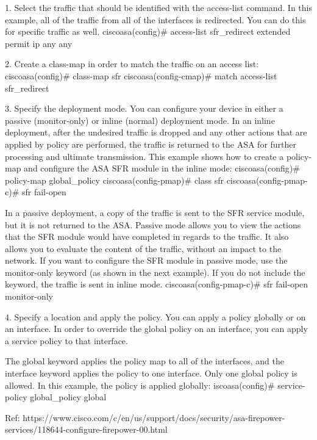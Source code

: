 1. Select the traffic that should be identified with the access-list command. In this example, all of the traffic from all of the interfaces is redirected. You can do this for specific traffic as well.
		ciscoasa(config)# access-list sfr_redirect extended permit ip any any

2. Create a class-map in order to match the traffic on an access list:
		ciscoasa(config)# class-map sfr
		ciscoasa(config-cmap)# match access-list sfr_redirect
	
3. Specify the deployment mode. You can configure your device in either a passive (monitor-only) or inline (normal) deployment mode.
	In an inline deployment, after the undesired traffic is dropped and any other actions that are applied by policy are performed, the traffic is returned to the ASA for further processing and ultimate transmission. This example shows how to create a policy-map and configure the ASA SFR module in the inline mode:
		ciscoasa(config)# policy-map global_policy
		ciscoasa(config-pmap)# class sfr
		ciscoasa(config-pmap-c)# sfr fail-open

	In a passive deployment, a copy of the traffic is sent to the SFR service module, but it is not returned to the ASA. Passive mode allows you to view the actions that the SFR module would have completed in regards to the traffic. It also allows you to evaluate the content of the traffic, without an impact to the network.
	If you want to configure the SFR module in passive mode, use the monitor-only keyword (as shown in the next example). If you do not include the keyword, the traffic is sent in inline mode.
		ciscoasa(config-pmap-c)# sfr fail-open monitor-only
		
4. Specify a location and apply the policy. You can apply a policy globally or on an interface. In order to override the global policy on an interface, you can apply a service policy to that interface.

	The global keyword applies the policy map to all of the interfaces, and the interface keyword applies the policy to one interface. Only one global policy is allowed. In this example, the policy is applied globally:
		iscoasa(config)# service-policy global_policy global
		
		
		
Ref: https://www.cisco.com/c/en/us/support/docs/security/asa-firepower-services/118644-configure-firepower-00.html